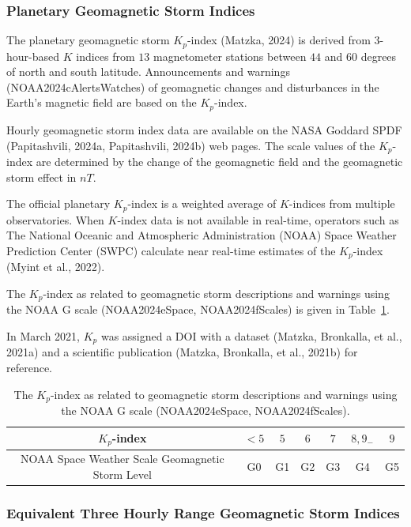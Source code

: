 \documentclass[sn-mathphys-num]{sn-jnl}%
\begin{document}
\subsubsection{Planetary Geomagnetic Storm Indices}

The planetary geomagnetic storm $K_{p}$-index (Matzka, 2024) is derived from $3$-hour-based $K$ indices from $13$ magnetometer stations between $44$ and $60$ degrees of north and south latitude. Announcements and warnings (NOAA2024cAlertsWatches) of geomagnetic changes and disturbances in the Earth's magnetic field are based on the $K_{p}$-index.

Hourly geomagnetic storm index data are available on the NASA Goddard SPDF (Papitashvili, 2024a, Papitashvili, 2024b) web pages. The scale values of the $K_{p}$-index are determined by the change of the geomagnetic field and the geomagnetic storm effect in $nT$.

The official planetary $K_{p}$-index is a weighted average of $K$-indices from multiple observatories. When $K$-index data is not available in real-time, operators such as The National Oceanic and Atmospheric Administration (NOAA) Space Weather Prediction Center (SWPC) calculate near real-time estimates of the $K_{p}$-index (Myint et al., 2022).

The $K_{p}$-index as related to geomagnetic storm descriptions and warnings using the NOAA G scale (NOAA2024eSpace, NOAA2024fScales) is given in Table~\ref{tab:Kp}.

In March 2021, $K_{p}$ was assigned a DOI with a dataset (Matzka, Bronkalla, et al., 2021a) and a scientific publication (Matzka, Bronkalla, et al., 2021b) for reference.

\begin{table}[!ht]
    \centering
    \caption{The $K_{p}$-index as related to geomagnetic storm descriptions and warnings using the NOAA G scale (NOAA2024eSpace, NOAA2024fScales).}
    \label{tab:Kp}
    \begin{tabular}{|c|c|c|c|c|c|c|}
        \hline
        $K_{p}$-index & $<5$ & $5$ & $6$ & $7$ & $8, 9_{-}$ & $9$ \\ \hline
        NOAA Space Weather Scale Geomagnetic Storm Level & G0 & G1 & G2 & G3 & G4 & G5 \\ \hline
    \end{tabular}
\end{table}

\subsubsection{Equivalent Three Hourly Range Geomagnetic Storm Indices}
\end{document}
